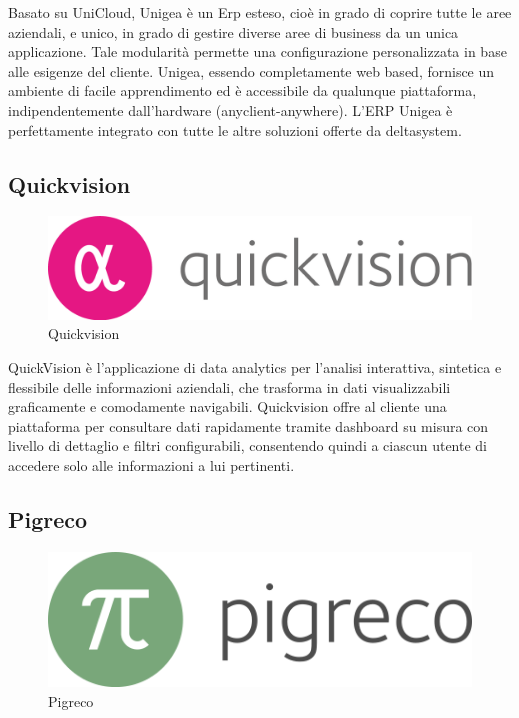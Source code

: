 \documentclass[target=bach,aauheader=,style=]{thud}
\begin{document}


Basato su UniCloud, Unigea è un Erp esteso, cioè in grado di coprire tutte le aree aziendali, e unico, in grado di gestire diverse aree di business da un unica applicazione. Tale modularità permette una configurazione personalizzata in base alle esigenze del cliente.
Unigea, essendo completamente web based, fornisce un ambiente di facile apprendimento ed è accessibile da qualunque piattaforma, indipendentemente dall’hardware (anyclient-anywhere).
L’ERP Unigea è perfettamente integrato con tutte le altre soluzioni offerte da deltasystem.


\subsection{Quickvision}
\begin{figure}
    \begin{center}
        \includegraphics[height=0.06\textheight]{quickvision.png}
    \end{center}
    \caption{Quickvision}
\end{figure}



QuickVision è l’applicazione di data analytics per l'analisi interattiva, sintetica e flessibile delle informazioni aziendali, che trasforma in dati visualizzabili graficamente e comodamente navigabili.
Quickvision offre al cliente una piattaforma per consultare dati rapidamente tramite dashboard su misura con livello di dettaglio e filtri configurabili, consentendo quindi a ciascun utente di accedere solo alle informazioni a lui pertinenti.


\subsection{Pigreco}

\begin{figure}
    \begin{center}
        \includegraphics[height=0.06\textheight]{pigreco.png}
    \end{center}
    \caption{Pigreco}
\end{figure}
\end{document}
